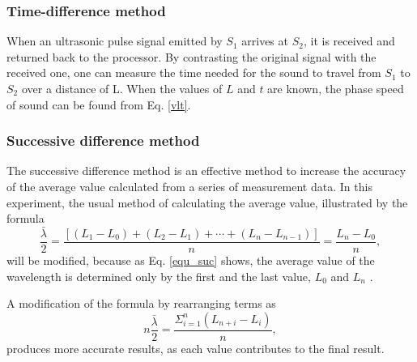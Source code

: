 \subsubsection{Time-difference method}
    When an ultrasonic pulse signal emitted by $S_1$ arrives at $S_2$, it is received and returned back to the processor. By contrasting the original signal with the received one, one can measure the time needed for the sound to travel from $S_1$ to $S_2$ over a distance of L. When the values of $L$ and $t$ are known, the phase speed of sound can be found from Eq. \ref{vlt}.\\
    
\subsubsection{Successive difference method}
    The successive difference method is an effective method to increase the accuracy of the average value calculated from a series of measurement data. In this experiment, the usual method of calculating the average value, illustrated by the formula
    \begin{equation}\label{equ_suc}
        \frac{\bar{\lambda}}{2}=\frac{[(L_1-L_0)+(L_2-L_1)+\cdots+(L_n-L_{n-1})]}{n}=\frac{L_n-L_0}{n},
    \end{equation}
    will be modified, because as Eq. \ref{equ_suc} shows, the average value of the wavelength is determined only by the first and the last value, $L_0$ and $L_n$ .

    A modification of the formula by rearranging terms as
    \begin{equation}\label{equ_suc}
        n\frac{\bar{\lambda}}{2}=\frac{\Sigma_{i=1}^{n}(L_{n+i}-L_i)}{n},
    \end{equation}
    produces more accurate results, as each value contributes to the final result.
